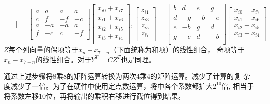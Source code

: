 \documentclass{article}
\numberwithin {equation}{section}
\begin{document}
\begin{spacing}{1.25}
\begin{equation}
\begin{bmatrix}
          \end{bmatrix}=\begin{bmatrix}
            a & a   & a   & a\\
            c & f   & -f  & -c\\
            a & -a  & -a  & a\\
            f & -c  & c   & -f\\
          \end{bmatrix}\begin{bmatrix}
            x_{i0}+x_{i7}\\
            x_{i1}+x_{i6}\\
            x_{i2}+x_{i5}\\
            x_{i3}+x_{i4}\\
          \end{bmatrix}, 
          \begin{bmatrix}
            z_{i1}\\z_{i3}\\z_{i5}\\z_{i7}\\
          \end{bmatrix}=\begin{bmatrix}
            b & d   & e   & g\\
            d & -g  & -b  & -e\\
            e & -b  & g   & d\\
            g & -e  & d   & -b\\
          \end{bmatrix}\begin{bmatrix}
            x_{i0}-x_{i7}\\
            x_{i1}-x_{i6}\\
            x_{i2}-x_{i5}\\
            x_{i3}-x_{i4}\\
          \end{bmatrix}
        \end{equation}
        $Z$每个列向量的偶项等于$x_{n}+x_{7-n}$（下面统称为和项）的线性组合，
        奇项等于$x_{n}-x_{7-n}$的线性组合。对于$Y^{T}=CZ^{T}$也是同理。

        通过上述步骤将8乘8的矩阵运算转换为两次4乘4的矩阵运算。减少了计算的复
        杂度减少了一倍。为了在硬件中使用定点数运算，将中各个系数都扩大$2^{10}$倍,
        相当于将系数左移10位，再将输出的乘积右移进行截位得到结果。


\end{spacing}
\end{document}
